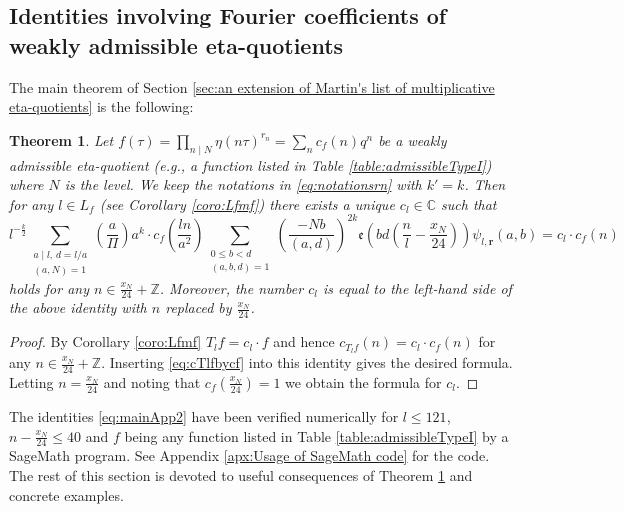 \documentclass[12pt]{amsart}
\numberwithin{equation}{section}
\theoremstyle{plain}
\newtheorem{thm}{Theorem}[section]
\theoremstyle{definition}
\theoremstyle{remark}
\newcommand\twoscript[2]{\substack{{#1} \\ {#2}}}
\newcommand\legendre[2]{\genfrac{(}{)}{}{}{#1}{#2}}
\newcommand\etp[1]{\mathfrak{e}\left(#1\right)}
\newcommand\numZ{\mathbb{Z}}
\newcommand\numC{\mathbb{C}}
\begin{document}
\subsection{Identities involving Fourier coefficients of weakly admissible eta-quotients}
\label{subsec:identitiesFourier}
The main theorem of Section \ref{sec:an extension of Martin's list of multiplicative eta-quotients} is the following:
\begin{thm}
\label{thm:mainApp2}
Let $f(\tau)=\prod_{n\mid N}\eta(n\tau)^{r_n}=\sum_{n}c_f(n)q^n$ be a weakly admissible eta-quotient (e.g., a function listed in Table \ref{table:admissibleTypeI}) where $N$ is the level. We keep the notations in \eqref{eq:notationsrn} with $k'=k$. Then for any $l\in L_f$ (see Corollary \ref{coro:Lfmf}) there exists a unique $c_l\in\numC$ such that
\begin{equation}
\label{eq:mainApp2}
l^{-\frac{k}{2}}\sum_{\twoscript{a\mid l,\,d=l/a}{(a,N)=1}}\legendre{a}{\varPi}a^k\cdot c_f\left(\frac{ln}{a^2}\right)\sum_{\twoscript{0\leq b<d}{(a,b,d)=1}}\legendre{-Nb}{(a,d)}^{2k}\etp{bd\left(\frac{n}{l}-\frac{x_N}{24}\right)}\psi_{l,\mathbf{r}}(a,b)=c_l\cdot c_f(n)
\end{equation}
holds for any $n\in\frac{x_N}{24}+\numZ$.
Moreover, the number $c_l$ is equal to the left-hand side of the above identity with $n$ replaced by $\frac{x_N}{24}$.
\end{thm}
\begin{proof}
By Corollary \ref{coro:Lfmf} $T_lf=c_l\cdot f$ and hence $c_{T_lf}(n)=c_l\cdot c_f(n)$ for any $n\in\frac{x_N}{24}+\numZ$. Inserting \eqref{eq:cTlfbycf} into this identity gives the desired formula. Letting $n=\frac{x_N}{24}$ and noting that $c_f\left(\frac{x_N}{24}\right)=1$ we obtain the formula for $c_l$.
\end{proof}

The identities \eqref{eq:mainApp2} have been verified numerically for $l\leq121$, $n-\frac{x_N}{24}\leq40$ and $f$ being any function listed in Table \ref{table:admissibleTypeI} by a SageMath program. See Appendix \ref{apx:Usage of SageMath code} for the code. The rest of this section is devoted to useful consequences of Theorem \ref{thm:mainApp2} and concrete examples.
\end{document}
